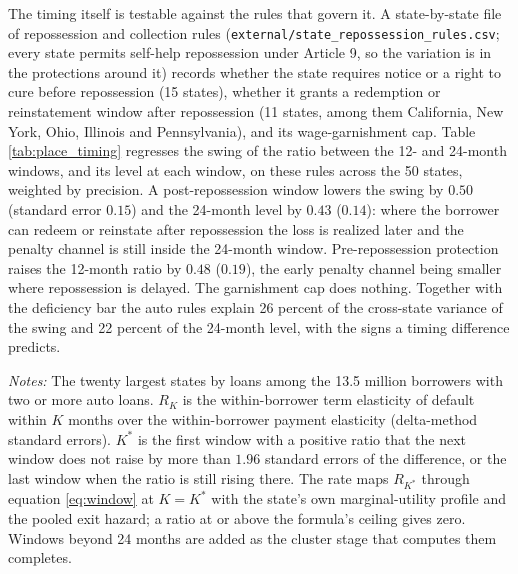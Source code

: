 The timing itself is testable against the rules that govern it. A state-by-state file of repossession and collection rules (\texttt{external/state\_repossession\_rules.csv}; every state permits self-help repossession under Article 9, so the variation is in the protections around it) records whether the state requires notice or a right to cure before repossession (15 states), whether it grants a redemption or reinstatement window after repossession (11 states, among them California, New York, Ohio, Illinois and Pennsylvania), and its wage-garnishment cap. Table \ref{tab:place_timing} regresses the swing of the ratio between the 12- and 24-month windows, and its level at each window, on these rules across the 50 states, weighted by precision. A post-repossession window lowers the swing by $0.50$ (standard error $0.15$) and the 24-month level by $0.43$ ($0.14$): where the borrower can redeem or reinstate after repossession the loss is realized later and the penalty channel is still inside the 24-month window. Pre-repossession protection raises the 12-month ratio by $0.48$ ($0.19$), the early penalty channel being smaller where repossession is delayed. The garnishment cap does nothing. Together with the deficiency bar the auto rules explain 26 percent of the cross-state variance of the swing and 22 percent of the 24-month level, with the signs a timing difference predicts.


\begin{table}[H]
\centering
\caption{The within-borrower ratio by state across windows, and the rate at the first window past the penalty channel}
\label{tab:rho_place}
\footnotesize
\resizebox{\textwidth}{!}{}
\vspace{0.5em}
\begin{minipage}{0.95\textwidth}
\noindent \small \textit{Notes:} The twenty largest states by loans among the 13.5 million borrowers with two or more auto loans. $R_K$ is the within-borrower term elasticity of default within $K$ months over the within-borrower payment elasticity (delta-method standard errors). $K^*$ is the first window with a positive ratio that the next window does not raise by more than $1.96$ standard errors of the difference, or the last window when the ratio is still rising there. The rate maps $R_{K^*}$ through equation \eqref{eq:window} at $K = K^*$ with the state's own marginal-utility profile and the pooled exit hazard; a ratio at or above the formula's ceiling gives zero. Windows beyond 24 months are added as the cluster stage that computes them completes.
\end{minipage}
\end{table}

